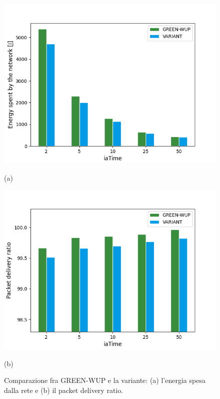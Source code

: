 \documentclass[binding=0.6cm,TFA]{sapthesis}
\begin{document}
\begin{figure}
    \centering
    \begin{minipage}{.5\textwidth}
        \centering
        \includegraphics[width=1\linewidth]{energy_plot.png}
        \caption*{(a)}
    \end{minipage}%
    \begin{minipage}{.5\textwidth}
        \centering
        \includegraphics[width=1\linewidth]{pdr_plot.png}
        \caption*{(b)}
    \end{minipage}
    \caption{Comparazione fra GREEN-WUP e la variante: (a) l'energia spesa dalla rete e (b) il packet delivery ratio.}
    \label{performance-energy}
\end{figure}
\end{document}
